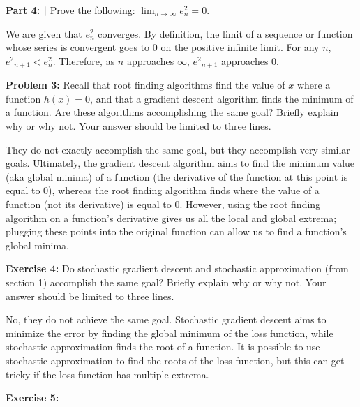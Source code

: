 \documentclass{article}
\begin{document}
 \textbf{Part 4: | }Prove the following: $\lim_{n \to \infty}e_n^2=0$.\newline
 
 We are given that $e_n^2$ converges. By definition, the limit of a sequence or function whose series is convergent goes to 0 on the positive infinite limit. For any $n$, ${e^2}_{n+1} < e_n^2$. Therefore, as $n$ approaches $\infty$, ${e^2}_{n+1}$ approaches 0.
 
 \newpage

 \begin{center}
      \Large\textbf{Problem 3:} Recall that root finding algorithms find the value of $x$ where a function $h(x) = 0$, and that a gradient descent algorithm finds the minimum of a function. Are these algorithms accomplishing the same goal? Briefly explain why or why not. Your answer should be limited to three lines.\par
 \end{center}
 
 They do not exactly accomplish the same goal, but they accomplish very similar goals. Ultimately, the gradient descent algorithm aims to find the minimum value (aka global minima) of a function (the derivative of the function at this point is equal to 0), whereas the root finding algorithm finds where the value of a function (not its derivative) is equal to 0. However, using the root finding algorithm on a function's derivative gives us all the local and global extrema; plugging these points into the original function can allow us to find a function's global minima.

 \newpage
 
 \begin{center}
      \Large\textbf{Exercise 4: }Do stochastic gradient descent and stochastic approximation (from section 1) accomplish the same goal? Briefly explain why or why not. Your answer should be limited to three lines.\par
 \end{center}
 
 No, they do not achieve the same goal. Stochastic gradient descent aims to minimize the error by finding the global minimum of the loss function, while stochastic approximation finds the root of a function. It is possible to use stochastic approximation to find the roots of the loss function, but this can get tricky if the loss function has multiple extrema.
 
 \newpage
 
 \begin{center}
     \Large\textbf{Exercise 5: }\par
 \end{center}
 
\end{document}
